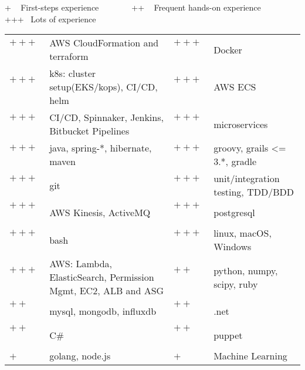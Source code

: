 
\newcommand{\plus}{$+~$~~~~}
\newcommand{\pplus}{$++~$~~~~}
\newcommand{\ppplus}{$+++$~~~~~}
\begin{cventries}
\cventry
{+ ~ First-steps experience ~~~  ~~~ ++ ~ Frequent hands-on experience ~~~  ~~~ +++ ~Lots of experience \vspace{0.1em}} %
{} %
{} %
{} %
{ %
\hspace{1em}
\setlength{\tabcolsep}{3pt}
\begin{tabular}{  l l @{\hskip 3mm} l l }
		   \ppplus & AWS CloudFormation and terraform &  \ppplus & Docker\\
		   \ppplus & k8s: cluster setup(EKS/kops), CI/CD, helm & \ppplus & AWS ECS\\
		   \ppplus & CI/CD, Spinnaker, Jenkins, Bitbucket Pipelines & \ppplus & microservices \\
           \ppplus & java, spring-*, hibernate, maven  & \ppplus & groovy, grails <= 3.*, gradle \\ 
           \ppplus & git & \ppplus & unit/integration testing, TDD/BDD   \\
		   \ppplus & AWS Kinesis, ActiveMQ & \ppplus & postgresql\\
           \ppplus & bash\vspace{0.7em} & \ppplus & linux, macOS, Windows\\ 
           \ppplus & AWS: Lambda, ElasticSearch, Permission Mgmt, EC2, ALB and ASG & \pplus &python, numpy, scipy, ruby \\ 
           \pplus & mysql, mongodb, influxdb  & \pplus & .net  \\
           \pplus & C\# & \pplus & puppet \\
           \plus & golang, node.js & \plus & Machine Learning 
\end{tabular}
}
\end{cventries}
